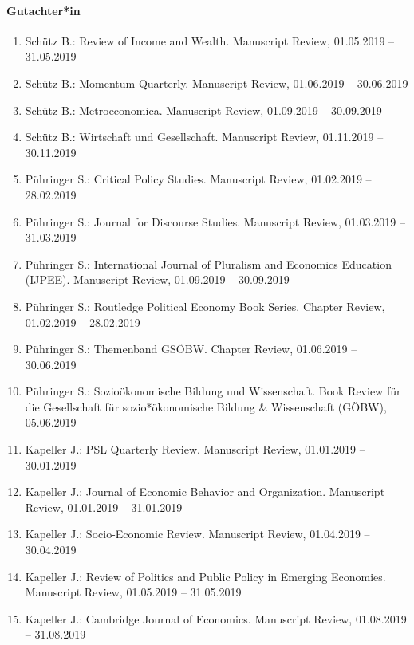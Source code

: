 \paragraph{Gutachter*in}
\begin{enumerate}[leftmargin=*, labelsep=0.5cm]
\item Schütz B.: Review of Income and Wealth. Manuscript Review, 01.05.2019 -- 31.05.2019
\item Schütz B.: Momentum Quarterly. Manuscript Review, 01.06.2019 -- 30.06.2019
\item Schütz B.: Metroeconomica. Manuscript Review, 01.09.2019 -- 30.09.2019
\item Schütz B.: Wirtschaft und Gesellschaft. Manuscript Review, 01.11.2019 -- 30.11.2019
\item Pühringer S.: Critical Policy Studies. Manuscript Review, 01.02.2019 -- 28.02.2019
\item Pühringer S.: Journal for Discourse Studies. Manuscript Review, 01.03.2019 -- 31.03.2019
\item Pühringer S.: International Journal of Pluralism and Economics Education (IJPEE). Manuscript Review, 01.09.2019 -- 30.09.2019
\item Pühringer S.: Routledge Political Economy Book Series. Chapter Review, 01.02.2019 -- 28.02.2019
\item Pühringer S.: Themenband GSÖBW. Chapter Review, 01.06.2019 -- 30.06.2019
\item Pühringer S.: Sozioökonomische Bildung und Wissenschaft. Book Review für die Gesellschaft für sozio*ökonomische Bildung \& Wissenschaft (GÖBW), 05.06.2019
\item Kapeller J.: PSL Quarterly Review. Manuscript Review, 01.01.2019 -- 30.01.2019
\item Kapeller J.: Journal of Economic Behavior and Organization. Manuscript Review, 01.01.2019 -- 31.01.2019
\item Kapeller J.: Socio-Economic Review. Manuscript Review, 01.04.2019 -- 30.04.2019
\item Kapeller J.: Review of Politics and Public Policy in Emerging Economies. Manuscript Review, 01.05.2019 -- 31.05.2019
\item Kapeller J.: Cambridge Journal of Economics. Manuscript Review, 01.08.2019 -- 31.08.2019
\end{enumerate}

